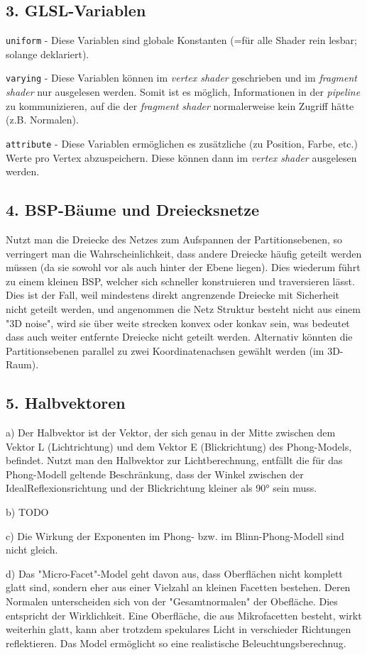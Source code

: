 \documentclass[a4paper,headings=small]{scrartcl}
\numberwithin{equation}{section} %
\numberwithin{figure}{section}   %
\begin{document}
\subsection*{3. GLSL-Variablen}

\texttt{uniform} - Diese Variablen sind globale Konstanten (=für alle Shader rein lesbar; solange deklariert).

\texttt{varying} - Diese Variablen können im \textit{vertex shader} geschrieben und im \textit{fragment shader} nur ausgelesen werden.
Somit ist es möglich, Informationen in der \textit{pipeline} zu kommunizieren, auf die der \textit{fragment shader} normalerweise kein Zugriff hätte (z.B. Normalen).

\texttt{attribute} - Diese Variablen ermöglichen es zusätzliche (zu Position, Farbe, etc.) Werte pro Vertex abzuspeichern. Diese können dann im \textit{vertex shader} ausgelesen werden.

\subsection*{4. BSP-Bäume und Dreiecksnetze}
Nutzt man die Dreiecke des Netzes zum Aufspannen der Partitionsebenen, so verringert man die Wahrscheinlichkeit, dass andere Dreiecke häufig geteilt werden müssen (da sie sowohl vor als auch hinter der Ebene liegen). Dies wiederum führt zu einem kleinen BSP, welcher sich schneller konstruieren und traversieren lässt.
Dies ist der Fall, weil mindestens direkt angrenzende Dreiecke mit Sicherheit nicht geteilt werden,
und angenommen die Netz Struktur besteht nicht aus einem "3D noise",
wird sie über weite strecken konvex oder konkav sein,
was bedeutet dass auch weiter entfernte Dreiecke nicht geteilt werden.
Alternativ könnten die Partitionsebenen parallel zu zwei Koordinatenachsen gewählt werden (im 3D-Raum).

\subsection*{5. Halbvektoren}
a) Der Halbvektor ist der Vektor, der sich genau in der Mitte zwischen dem Vektor L (Lichtrichtung) und dem Vektor E (Blickrichtung) des Phong-Models, befindet.
Nutzt man den Halbvektor zur Lichtberechnung, entfällt die für das Phong-Modell geltende Beschränkung, dass der Winkel zwischen der IdealReflexionsrichtung und der Blickrichtung kleiner als 90° sein muss.

b) %
TODO

c) Die Wirkung der Exponenten im Phong- bzw. im Blinn-Phong-Modell sind nicht gleich.

d) Das "Micro-Facet"-Model geht davon aus, dass Oberflächen nicht komplett glatt sind, sondern eher aus einer Vielzahl an kleinen Facetten bestehen. Deren Normalen unterscheiden sich von der "Gesamtnormalen" der Obefläche. Dies entspricht der Wirklichkeit. Eine Oberfläche, die aus Mikrofacetten besteht, wirkt weiterhin glatt, kann aber trotzdem spekulares Licht in verschieder Richtungen reflektieren. Das Model ermöglicht so eine realistische Beleuchtungsberechnug.
\end{document}
